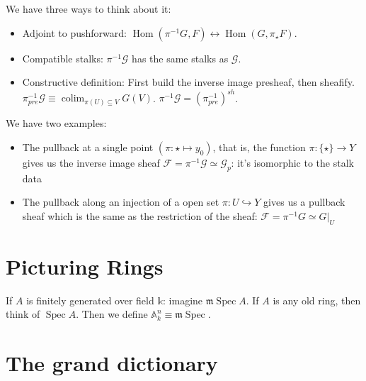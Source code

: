 \documentclass{book}
\newcommand{\Hom}{\operatorname{Hom}}
\newcommand{\F}{\ensuremath{\mathcal{F}}}
\newcommand{\G}{\ensuremath{\mathcal{G}}}
\newcommand{\A}{\ensuremath{\mathbb{A}}}
\newcommand{\spec}{\operatorname{Spec}}
\newcommand{\m}{\mathfrak{m}}
\newcommand{\mspec}{\m\operatorname{Spec}}
\newcommand{\colim}{\operatorname{colim}}
\newcommand{\inv}{\ensuremath{-1}}
\renewcommand{\k}{\mathbb{k}} %
\theoremstyle{definition}
\begin{document}
We have three ways to think about it:
\begin{itemize}
    \item Adjoint to pushforward: 
        $\Hom(\pi^\inv G, F) \leftrightarrow \Hom(G, \pi_\star F)$.
    \item Compatible stalks: $\pi^\inv \G$ has the same stalks as $\G$.
    \item Constructive definition: First build
    the inverse image presheaf, then sheafify.
    $\pi^\inv_{pre} \G \equiv \colim_{\pi(U) \subseteq V} G(V)$.
    $\pi^\inv \G = \left (\pi^\inv_{pre}\right)^{sh}$.
\end{itemize}

We have two examples:
\begin{itemize}
    \item The pullback at a single point $(\pi: \star \mapsto y_0)$, 
    that is, the 
    function $\pi: \{\star\} \rightarrow Y$ gives
    us the inverse image sheaf $\F = \pi^\inv \G \simeq \G_p$: it's isomorphic
    to the stalk data
    \item The pullback along an injection of a open set $\pi: U \hookrightarrow Y$
    gives us a pullback sheaf which is the same as the
    restriction of the sheaf: $\F = \pi^\inv G \simeq G|_U$
\end{itemize}


\section{Picturing Rings}

If $A$ is finitely generated over field $\k$: imagine $\mspec A$.
If $A$ is any old ring, then think of $\spec A$. Then we define
$\A_k^n \equiv \mspec$.

\section{The grand dictionary}
\end{document}
